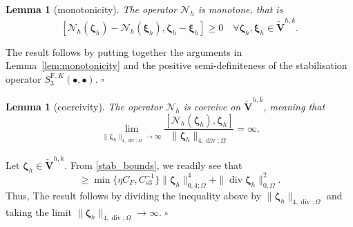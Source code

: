 \documentclass[fleqn,a4paper]{cas-sc}
\newcommand\vdiv{\mathop{\mathrm{div}}\nolimits}
\newcommand{\bxi}{\boldsymbol{\xi}}
\newcommand{\bzeta}{\boldsymbol{\zeta}}
\newcommand{\0}{\boldsymbol{0}}
\newcommand\cN{\mathcal{N}}
\newcommand\bV{\mathbf{V}}
\newcommand\rF{\mathrm{F}}
\numberwithin{equation}{section}
\numberwithin{figure}{section}
\newtheorem{lemma}[theorem]{Lemma}
\newenvironment{proof}{\noindent{\it Proof.}}{\hfill$\square$}
\begin{document}
{\begin{lemma}[monotonicity]\label{lem:monotonicity_h}
   The operator $\cN_h$ is monotone, that is
\[[\cN_h(\bzeta_h) - \cN_h(\bxi_h), \bzeta_h - \bxi_h] \ge 0 \quad \forall \bzeta_h, \bxi_h \in \widetilde{\bV}^{h,\overline{k}}.\]
\end{lemma}
\begin{proof}
    The result follows by putting together the arguments in Lemma~\ref{lem:monotonicity} and the positive semi-definiteness of the stabilisation operator $S_3^{\rF,K}(\bullet,\bullet)$.
\end{proof}}
{\begin{lemma}[coercivity]\label{lem:coercivity_h}
    The operator $\cN_h$ is coercive on $\widetilde{\bV}^{h,\overline{k}}$, meaning that
\[\lim_{\|\bzeta_h\|_{{4,\vdiv;\Omega}} \to \infty} \frac{[\cN_h(\bzeta_h), \bzeta_h]}{\|\bzeta_h\|_{{4,\vdiv;\Omega}}} = \infty.\]
\end{lemma}
\begin{proof}
    Let $\bzeta_h \in \widetilde{\bV}^{h,\overline{k}}$. From \eqref{stab_bounds}, we readily see that
    \begin{equation*}
        [\cN_h(\bzeta_h), \bzeta_h] \ge \min\{\eta C_F,C_{s3}^{-1}\} \|\bzeta_h\|_{0,4;\Omega}^4 + \|\vdiv \bzeta_h\|_{0,\Omega}^2.
    \end{equation*}
    Thus, The result follows by dividing the inequality above by $\|\bzeta_h\|_{4,\vdiv;\Omega}$ and taking the limit $\|\bzeta_h\|_{4,\vdiv;\Omega} \to \infty$.
\end{proof}}
\end{document}
